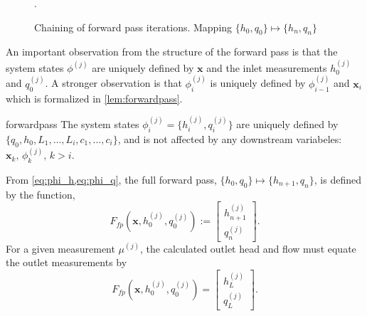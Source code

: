 \begin{figure}[h!]
    \centering
    
    \caption{Chaining of forward pass iterations. Mapping $\{h_{0},q_{0}\}\mapsto\{h_{n}, q_n\}$}.
    \label{fig:complete_forward_pass}
\end{figure}

An important observation from the structure of the forward pass is that the system states $\phi^{(j)}$ are uniquely defined by $\mathbf{x}$ and the inlet measurements $h_0^{(j)}$ and $q_0^{(j)}$. A stronger observation is that $\phi_i^{(j)}$ is uniquely defined by $\phi_{i-1}^{(j)}$ and $\mathbf{x}_i$ which is formalized in \autoref{lem:forwardpass}.

\begin{lemma}{}{forwardpass}
The system states $\phi_i^{(j)}=\{h_i^{(j)},q_i^{(j)}\}$ are uniquely defined by $\{q_0,h_0,L_1,\dots,L_i,c_1,\dots,c_i\}$, and is not affected by any downstream variabeles: $\mathbf{x}_k,\, \phi_k^{(j)},\,k>i$.
\end{lemma}

From \cref{eq:phi_h,eq:phi_q}, the full forward pass, $\{h_{0},q_{0}\}\mapsto\{h_{n+1}, q_n\}$, is defined by the function, 
\begin{equation*}
    F_{fp}(\mathbf{x}, h_0^{(j)},q_0^{(j)}) := \begin{bmatrix}
        h^{(j)}_{n+1}\\[0.4em]
        q^{(j)}_n
    \end{bmatrix}.
\end{equation*}
For a given measurement $\mu^{(j)}$, the calculated outlet head and flow must equate the outlet measurements by
\begin{equation}
    \label{eq:forward_pass}
    F_{fp}(\mathbf{x}, h_0^{(j)},q_0^{(j)}) = \begin{bmatrix}
        h_L^{(j)}\\[0.4em]
        q_L^{(j)}
    \end{bmatrix}.
\end{equation}


